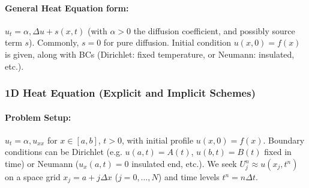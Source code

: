 \documentclass[a4paper,11pt]{article}
\begin{document}
\paragraph{General Heat Equation form:}
$u_t = \alpha, \Delta u + s(x,t)$ (with $\alpha>0$ the diffusion coefficient, and possibly source term $s$). Commonly, $s=0$ for pure diffusion. Initial condition $u(x,0)=f(x)$ is given, along with BCs (Dirichlet: fixed temperature, or Neumann: insulated, etc.).
\subsubsection{1D Heat Equation (Explicit and Implicit Schemes)}
\paragraph{Problem Setup:}
$u_t = \alpha, u_{xx}$ for $x\in[a,b]$, $t>0$, with initial profile $u(x,0)=f(x)$. Boundary conditions can be Dirichlet (e.g. $u(a,t)=A(t)$, $u(b,t)=B(t)$ fixed in time) or Neumann ($u_x(a,t)=0$ insulated end, etc.). We seek $U_j^n \approx u(x_j, t^n)$ on a space grid $x_j = a + j\Delta x$ ($j=0,\dots,N$) and time levels $t^n = n\Delta t$.
\end{document}
